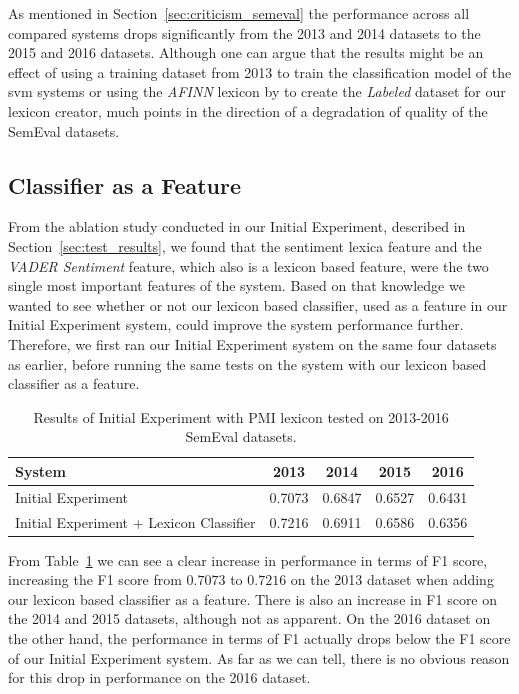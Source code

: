 As mentioned in Section~\ref{sec:criticism_semeval} the performance across all compared systems drops significantly from the 2013 and 2014 datasets to the 2015 and 2016 datasets. Although one can argue that the results might be an effect of using a training dataset from 2013 to train the classification model of the \ac{svm} systems or using the \textit{AFINN} lexicon by \cite{AFINN} to create the \textit{Labeled} dataset for our lexicon creator, much points in the direction of a degradation of quality of the SemEval datasets.


\subsection{Classifier as a Feature}
From the ablation study conducted in our Initial Experiment, described in Section~\ref{sec:test_results}, we found that the sentiment lexica feature and the \textit{VADER Sentiment} feature, which also is a lexicon based feature, were the two single most important features of the system. Based on that knowledge we wanted to see whether or not our lexicon based classifier, used as a feature in our Initial Experiment system, could improve the system performance further. Therefore, we first ran our Initial Experiment system on the same four datasets as earlier, before running the same tests on the system with our lexicon based classifier as a feature. \\

\begin{table}[t]
    \centering
    \begin{tabular}{|l|c|c|c|c|}
        \hline
        \textbf{System} & \textbf{2013} & \textbf{2014} & \textbf{2015} & \textbf{2016} \\ \hline
        Initial Experiment & 0.7073 & 0.6847 & 0.6527 & 0.6431 \\ \hline
        Initial Experiment + Lexicon Classifier & 0.7216 & 0.6911 & 0.6586 & 0.6356 \\ \hline
    \end{tabular}
    \caption[Results of Initial Experiment with PMI lexicon]{Results of Initial Experiment with PMI lexicon tested on 2013-2016 SemEval datasets.}
    \label{tab:initial_experiment_with_lexicon}   
\end{table}

From Table~\ref{tab:initial_experiment_with_lexicon} we can see a clear increase in performance in terms of F1 score, increasing the F1 score from $0.7073$ to $0.7216$ on the 2013 dataset when adding our lexicon based classifier as a feature. There is also an increase in F1 score on the 2014 and 2015 datasets, although not as apparent. On the 2016 dataset on the other hand, the performance in terms of F1 actually drops below the F1 score of our Initial Experiment system. As far as we can tell, there is no obvious reason for this drop in performance on the 2016 dataset.



